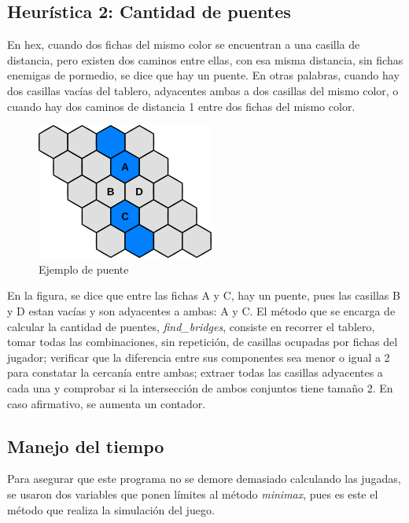 \documentclass[spanish]{article}
\begin{document}
\subsection{Heur\'istica 2: Cantidad de puentes}
En hex, cuando dos fichas del mismo color se encuentran a una casilla de distancia, pero existen dos caminos entre ellas, con esa misma distancia, sin fichas enemigas de pormedio, se dice que hay un puente. En otras palabras, cuando hay dos casillas vac\'ias del tablero, adyacentes ambas a dos casillas del mismo color, o cuando hay dos caminos de distancia 1 entre dos fichas del mismo color.
\begin{figure}[H]
    \centering
    \includegraphics[scale=0.5]{puente.png}
    \caption{Ejemplo de puente}
    \label{fig:puente}
\end{figure}
En la figura, se dice que entre las fichas A y C, hay un puente, pues las casillas B y D estan vac\'ias y son adyacentes a ambas: A y C.
El m\'etodo que se encarga de calcular la cantidad de puentes, \textit{find\_bridges}, consiste en recorrer el tablero, tomar todas las combinaciones, sin repetici\'on, de casillas ocupadas por fichas del jugador; verificar que la diferencia entre sus componentes sea menor o igual a 2 para constatar la cercan\'ia entre ambas; extraer todas las casillas adyacentes a cada una y comprobar si la intersecci\'on de ambos conjuntos tiene tama\~no 2. En caso afirmativo, se aumenta un contador.\\

\subsection{Manejo del tiempo}
Para asegurar que este programa no se demore demasiado calculando las jugadas, se usaron dos variables que ponen l\'imites al m\'etodo \textit{minimax}, pues es este el m\'etodo que realiza la simulaci\'on del juego.\\
\end{document}
